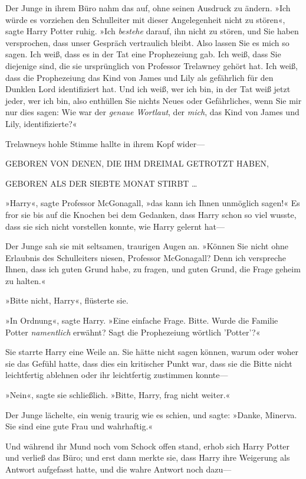 {Der Junge in ihrem Büro nahm das auf, ohne seinen Ausdruck zu ändern. »Ich würde es vorziehen den Schulleiter mit dieser Angelegenheit nicht zu stören«, sagte Harry Potter ruhig. »Ich \emph{bestehe} darauf, ihn nicht zu stören, und Sie haben versprochen, dass unser Gespräch vertraulich bleibt. Also lassen Sie es mich so sagen. Ich weiß, dass es in der Tat eine Prophezeiung gab. Ich weiß, dass Sie diejenige sind, die sie ursprünglich von Professor Trelawney gehört hat. Ich weiß, dass die Prophezeiung das Kind von James und Lily als gefährlich für den Dunklen Lord identifiziert hat. Und ich weiß, wer ich bin, in der Tat weiß jetzt jeder, wer ich bin, also enthüllen Sie nichts Neues oder Gefährliches, wenn Sie mir nur dies sagen: Wie war der \emph{genaue Wortlaut}, der \emph{mich}, das Kind von James und Lily, identifizierte?«

Trelawneys hohle Stimme hallte in ihrem Kopf wider—

GEBOREN VON DENEN, DIE IHM DREIMAL GETROTZT HABEN,

GEBOREN ALS DER SIEBTE MONAT STIRBT …

»Harry«, sagte Professor McGonagall, »das kann ich Ihnen unmöglich sagen!« Es fror sie bis auf die Knochen bei dem Gedanken, dass Harry schon so viel wusste, dass sie sich nicht vorstellen konnte, wie Harry gelernt hat—

Der Junge sah sie mit seltsamen, traurigen Augen an. »Können Sie nicht ohne Erlaubnis des Schulleiters niesen, Professor McGonagall? Denn ich verspreche Ihnen, dass ich guten Grund habe, zu fragen, und guten Grund, die Frage geheim zu halten.«

»Bitte nicht, Harry«, flüsterte sie.

»In Ordnung«, sagte Harry. »Eine einfache Frage. Bitte. Wurde die Familie Potter \emph{namentlich} erwähnt? Sagt die Prophezeiung wörtlich 'Potter'?«

Sie starrte Harry eine Weile an. Sie hätte nicht sagen können, warum oder woher sie das Gefühl hatte, dass dies ein kritischer Punkt war, dass sie die Bitte nicht leichtfertig ablehnen oder ihr leichtfertig zustimmen konnte—

»Nein«, sagte sie schließlich. »Bitte, Harry, frag nicht weiter.«

Der Junge lächelte, ein wenig traurig wie es schien, und sagte: »Danke, Minerva. Sie sind eine gute Frau und wahrhaftig.«

Und während ihr Mund noch vom Schock offen stand, erhob sich Harry Potter und verließ das Büro; und erst dann merkte sie, dass Harry ihre Weigerung als Antwort aufgefasst hatte, und die wahre Antwort noch dazu—

}

